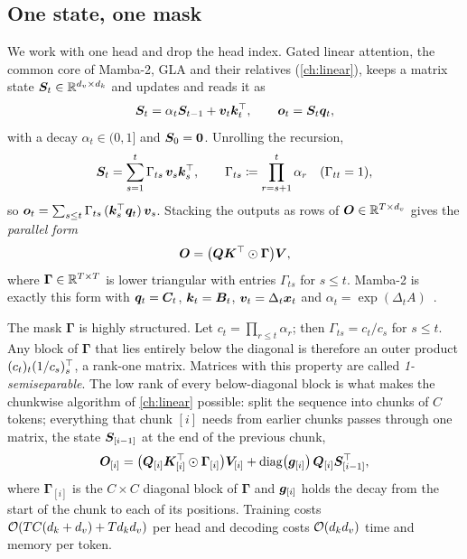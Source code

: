\subsection{One state, one mask}\label{sec:c07-onestate}

We work with one head and drop the head index. Gated linear attention, the common core of
Mamba-2, GLA and their relatives (\cref{ch:linear}), keeps a matrix state
$\bm{S}_t \in \mathbb{R}^{d_v \times d_k}$ and updates and reads it as
\begin{equation}\label{eq:c07-gla}
  \bm{S}_t = \alpha_t \bm{S}_{t-1} + \bm{v}_t \bm{k}_t^{\top}, \qquad \bm{o}_t = \bm{S}_t \bm{q}_t ,
\end{equation}
with a decay $\alpha_t \in (0,1]$ and $\bm{S}_0 = \bm{0}$. Unrolling the recursion,
\begin{equation}\label{eq:c07-unroll}
  \bm{S}_t = \sum_{s=1}^{t} \Gamma_{ts}\, \bm{v}_s \bm{k}_s^{\top},
  \qquad \Gamma_{ts} \coloneqq \prod_{r=s+1}^{t} \alpha_r \quad (\Gamma_{tt} = 1),
\end{equation}
so $\bm{o}_t = \sum_{s \le t} \Gamma_{ts}\, (\bm{k}_s^{\top} \bm{q}_t)\, \bm{v}_s$. Stacking the outputs as
rows of $\bm{O} \in \mathbb{R}^{T \times d_v}$ gives the \emph{parallel form}
\begin{equation}\label{eq:c07-parallel}
  \bm{O} = \bigl(\bm{Q}\bm{K}^{\top} \odot \bm{\Gamma}\bigr) \bm{V} ,
\end{equation}
where $\bm{\Gamma} \in \mathbb{R}^{T\times T}$ is lower triangular with entries $\Gamma_{ts}$ for
$s \le t$. Mamba-2 is exactly this form with $\bm{q}_t = \bm{C}_t$, $\bm{k}_t = \bm{B}_t$,
$\bm{v}_t = \Delta_t \bm{x}_t$ and $\alpha_t = \exp(\Delta_t A)$~\citep{dao2024ssd}.

The mask $\bm{\Gamma}$ is highly structured. Let $c_t = \prod_{r \le t}\alpha_r$; then
$\Gamma_{ts} = c_t / c_s$ for $s \le t$. Any block of $\bm{\Gamma}$ that lies entirely below
the diagonal is therefore an outer product $(c_t)_t (1/c_s)_s^{\top}$, a rank-one matrix. Matrices
with this property are called \emph{1-semiseparable}. The low rank of every below-diagonal
block is what makes the chunkwise algorithm of \cref{ch:linear} possible: split the sequence
into chunks of $C$ tokens; everything that chunk $[i]$ needs from earlier chunks passes
through one matrix, the state $\bm{S}_{[i-1]}$ at the end of the previous chunk,
\begin{equation}\label{eq:c07-chunk}
  \bm{O}_{[i]} = \bigl(\bm{Q}_{[i]}\bm{K}_{[i]}^{\top} \odot \bm{\Gamma}_{[i]}\bigr)\bm{V}_{[i]}
            + \operatorname{diag}\bigl(\bm{g}_{[i]}\bigr)\, \bm{Q}_{[i]}\bm{S}_{[i-1]}^{\top} ,
\end{equation}
where $\bm{\Gamma}_{[i]}$ is the $C \times C$ diagonal block of $\bm{\Gamma}$ and
$\bm{g}_{[i]}$ holds the decay from the start of the chunk to each of its positions. Training
costs $\mathcal{O}(TC(d_k+d_v) + T d_k d_v)$ per head and decoding costs
$\mathcal{O}(d_k d_v)$ time and memory per token.

